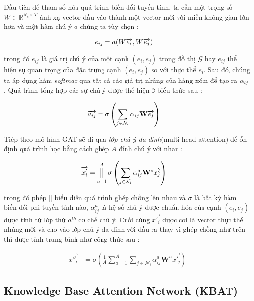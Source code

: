 Đầu tiên để tham số hóa quá trình biến đổi tuyến tính, ta cần một trọng số $W \in \mathbb{R}^{N_e \times T}$ ánh xạ vector đầu vào thành một vector mới với miền không gian lớn hơn và một hàm chú ý $a$ chúng ta tùy chọn :

\begin{align}
\centering
{e_{ij}}&={a(W \overrightarrow{e_i}, W \overrightarrow{e_j})}
\end{align}

trong đó $e_{ij}$ là giá trị chú ý của một cạnh $(e_i, e_j)$ trong đồ thị $\mathcal{G}$ hay $e_{ij}$ thể hiện sự quan trọng của đặc trưng cạnh $(e_i, e_j)$ so với thực thể $e_i$. Sau đó, chúng ta áp dụng hàm \textit{softmax} qua tất cả các giá trị nhúng của hàng xóm để tạo ra $\alpha_{ij}$ . Quá trình tổng hợp các sự chú ý được thể hiện ở biểu thức sau : 

\begin{align}
\centering
{\overrightarrow{a_{ij}}}&={\sigma\left(\sum_{j\in \mathcal{N}_i} {\alpha_{ij} \mathbf{W} \overrightarrow{e_j} }\right)}
\end{align}

Tiếp theo mô hình GAT sẽ đi qua \textit{lớp chú ý đa đỉnh}(multi-head attention) để ổn định quá trình học bằng cách ghép $A$ đỉnh chú ý với nhau :

\begin{align}
{\overrightarrow{x'_i}}&={\bigparallel_{a=1}^{A}\sigma\left(\sum_{j\in \mathcal{N}_i}\alpha_{ij}^{a} \mathbf{W}^{a} \overrightarrow{x_{j}} \right)}
\end{align}

trong đó phép $||$ biểu diễn quá trình ghép chồng lên nhau và $\sigma$ là bất kỳ hàm biến đổi phi tuyến tính nào, $\alpha_{ij}^a$ là hệ số chú ý được chuẩn hóa của cạnh $(e_i, e_j)$ được tính từ lớp thứ $a^{th}$	 cơ chế chú ý. Cuối cùng $\overrightarrow{x'_i}$ được coi là vector thực thể nhúng mới và cho vào lớp chú ý đa đỉnh với đầu ra thay vì ghép chồng như trên thì được tính trung bình như công thức sau :

\begin{align}
{\overrightarrow{x''_i}}&={\sigma\left(\frac{1}{A} \sum_{a=1}^{A}\sum_{j\in \mathcal{N}_i}\alpha_{ij}^{a} \mathbf{W}^{a} \overrightarrow{x'_{j}} \right)}
\end{align}

\subsection{Knowledge Base Attention Network (KBAT)}

